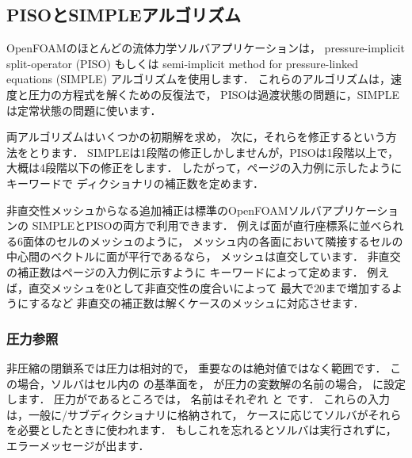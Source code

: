 \subsection{PISOとSIMPLEアルゴリズム}
\label{ssec:4.5.3}
OpenFOAMのほとんどの流体力学ソルバアプリケーションは，
pressure-implicit split-operator (PISO) もしくは
semi-implicit method for pressure-linked equations
(SIMPLE) アルゴリズムを使用します．
これらのアルゴリズムは，速度と圧力の方程式を解くための反復法で，
PISOは過渡状態の問題に，SIMPLEは定常状態の問題に使います．

両アルゴリズムはいくつかの初期解を求め，
次に，それらを修正するという方法をとります．
SIMPLEは1段階の修正しかしませんが，PISOは1段階以上で，大概は4段階以下の修正をします．
したがって，\pageref{p:U-117}ページの入力例に示したようにキーワードで
ディクショナリの補正数を定めます．

非直交性メッシュからなる追加補正は標準のOpenFOAMソルバアプリケーションの
SIMPLEとPISOの両方で利用できます．
例えば面が直行座標系に並べられる6面体のセルのメッシュのように，
メッシュ内の各面において隣接するセルの中心間のベクトルに面が平行であるなら，
メッシュは直交しています．
非直交の補正数は\pageref{p:U-117}ページの入力例に示すように
キーワードによって定めます．
例えば，直交メッシュを$0$として非直交性の度合いによって
最大で$20$まで増加するようにするなど
非直交の補正数は解くケースのメッシュに対応させます．

\subsubsection{圧力参照}
\label{sssec:4.5.3.1}
非圧縮の閉鎖系では圧力は相対的で，
重要なのは絶対値ではなく範囲です．
この場合，ソルバはセル内の
%
%
の基準面を，
が圧力の変数解の名前の場合，
%
%
に設定します．
圧力がであるところでは，
名前はそれぞれ
%
%
と
%
%
です．
これらの入力は，一般に/サブディクショナリに格納されて，
ケースに応じてソルバがそれらを必要としたときに使われます．
もしこれを忘れるとソルバは実行されずに，エラーメッセージが出ます．


